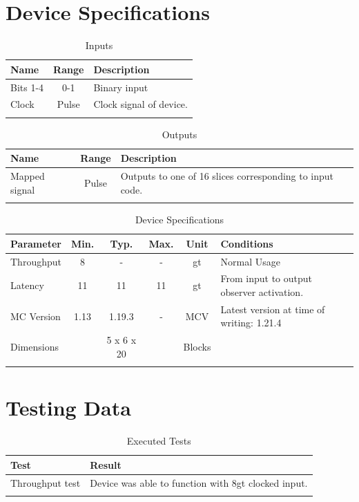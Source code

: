 \documentclass[10pt]{datasheet}
\begin{document}
\section{Device Specifications}

\begin{table}[H]
    \caption{Inputs}
    \begin{tabularx}{\textwidth}{l | c | X}
        \thickhline
        \textbf{Name} & \textbf{Range} & \textbf{Description} \\
        \hline
        Bits 1-4 & 0-1 & Binary input \\
        \hline
        Clock & Pulse & Clock signal of device. \\
        \thickhline
\end{tabularx}
\end{table}

\begin{table}[H]
    \caption{Outputs}
    \begin{tabularx}{\textwidth}{l | c | X}
        \thickhline
        \textbf{Name} & \textbf{Range} & \textbf{Description} \\
        \hline
        Mapped signal & Pulse & Outputs to one of 16 slices corresponding to input code. \\
        \thickhline
\end{tabularx}
\end{table}

\begin{table}[H]
    \caption{Device Specifications}
    \begin{tabularx}{\textwidth}{l | c c c | c | X}
        \thickhline
        \textbf{Parameter} & \textbf{Min.} & \textbf{Typ.} & \textbf{Max.} &
        \textbf{Unit} & \textbf{Conditions} \\
        \hline
        Throughput  & 8 & - & - & gt & Normal Usage \\
        \hline
        Latency    & 11 & 11 & 11 & gt & From input to output observer activation. \\
        \hline
        MC Version & 1.13 & 1.19.3 & - & MCV & Latest version at time of writing: 1.21.4\\
        \hline
        Dimensions & & 5 x 6 x 20 & & Blocks & \\
        \thickhline
\end{tabularx}
\end{table}
\section{Testing Data}
\begin{table}[H]
\caption{Executed Tests}
\begin{tabularx}{\textwidth}{l | X}
    \thickhline
    \textbf{Test} & \textbf{Result} \\
    \hline
    Throughput test & Device was able to function with 8gt clocked input. \\
    \thickhline
\end{tabularx}
\end{table}
\end{document}

